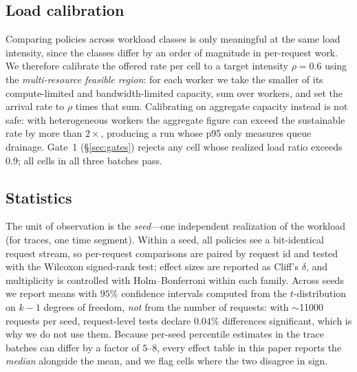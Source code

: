 \subsection{Load calibration}
Comparing policies across workload classes is only meaningful at the same load intensity, since
the classes differ by an order of magnitude in per-request work. We therefore calibrate the
offered rate per cell to a target intensity $\rho = 0.6$ using the \emph{multi-resource feasible
region}: for each worker we take the smaller of its compute-limited and bandwidth-limited
capacity, sum over workers, and set the arrival rate to $\rho$ times that sum. Calibrating on
aggregate capacity instead is not safe: with heterogeneous workers the aggregate figure can
exceed the sustainable rate by more than $2\times$, producing a run whose p95 only measures queue
drainage. Gate~1 (\S\ref{sec:gates}) rejects any cell whose realized load ratio exceeds $0.9$;
all cells in all three batches pass.

\subsection{Statistics}
The unit of observation is the \emph{seed}---one independent realization of the workload (for
traces, one time segment). Within a seed, all policies see a bit-identical request stream, so
per-request comparisons are paired by request id and tested with the Wilcoxon signed-rank test;
effect sizes are reported as Cliff's $\delta$, and multiplicity is controlled with
Holm--Bonferroni within each family. Across seeds we report means with $95\%$ confidence
intervals computed from the $t$-distribution on $k-1$ degrees of freedom, \emph{not} from the
number of requests: with $\sim$\num{11000} requests per seed, request-level tests declare
$0.04\%$ differences significant, which is why we do not use them. Because per-seed percentile
estimates in the trace batches can differ by a factor of $5$--$8$, every effect table in this
paper reports the \emph{median} alongside the mean, and we flag cells where the two disagree in
sign.

